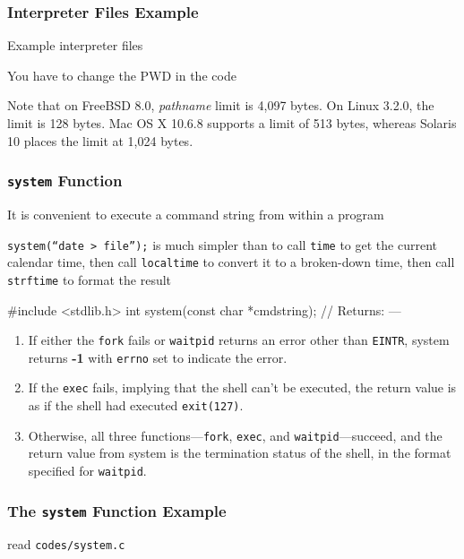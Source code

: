 \documentclass[newPxFont,sthlmFooter,nooffset]{beamer}
\begin{document}
\begin{frame}[containsverbatim,t]
  \frametitle{Interpreter Files Example}

Example interpreter files


You have to change the PWD in the code

{\footnotesize Note that on FreeBSD 8.0, \textit{pathname} limit is 4,097 bytes. On Linux 3.2.0, the limit is 128 bytes. Mac OS X 10.6.8 supports a limit of 513 bytes, whereas Solaris 10 places the limit at 1,024 bytes.}

\end{frame}



\begin{frame}[containsverbatim,t]
  \frametitle{\texttt{system} Function}
It is convenient to execute a command string from within a program

\texttt{system(``date > file'');}  is much simpler than to call \texttt{time} to get the current calendar time, then call \texttt{localtime} to convert it to a broken-down time, then call \texttt{strftime} to format the result

\begin{codedef}
#include <stdlib.h>
int system(const char *cmdstring);
// Returns: ---
\end{codedef}

\begin{enumerate}
\item If either the \texttt{fork} fails or \texttt{waitpid} returns an
  error other than \texttt{EINTR}, system returns \textbf{-1} with
  \texttt{errno} set to indicate the error.
\item If the \texttt{exec} fails, implying that the shell can’t be
  executed, the return value is as if the shell had executed
  \texttt{exit(127)}.
\item Otherwise, all three functions---\texttt{fork}, \texttt{exec},
  and \texttt{waitpid}---succeed, and the return value from system is
  the termination status of the shell, in the format specified for
  \texttt{waitpid}.
\end{enumerate}
\end{frame}

\begin{frame}[containsverbatim,t]
  \frametitle{The \texttt{system} Function Example}
read \texttt{codes/system.c}

\end{frame}
\end{document}
